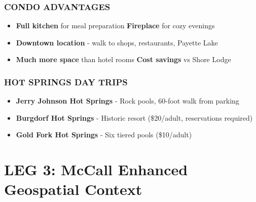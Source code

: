 \documentclass[
  11pt,
]{article}
\providecommand{\tightlist}{%
  \setlength{\itemsep}{0pt}\setlength{\parskip}{0pt}}
\begin{document}
\subsubsection{\texorpdfstring{\textcolor{primary}{CONDO ADVANTAGES}}{}}\label{section-21}

\begin{itemize}
\tightlist
\item
  \textbf{\textcolor{secondary}{Full kitchen}} for meal preparation
  \textbar{} \textbf{\textcolor{secondary}{Fireplace}} for cozy
  evenings\\
\item
  \textbf{\textcolor{secondary}{Downtown location}} - walk to shops,
  restaurants, Payette Lake\\
\item
  \textbf{\textcolor{secondary}{Much more space}} than hotel rooms
  \textbar{} \textbf{\textcolor{secondary}{Cost savings}} vs Shore Lodge
\end{itemize}

\subsubsection{\texorpdfstring{\textcolor{primary}{HOT SPRINGS DAY TRIPS}}{}}\label{section-22}

\begin{itemize}
\tightlist
\item
  \textbf{\textcolor{secondary}{Jerry Johnson Hot Springs}} - Rock
  pools, 60-foot walk from parking
\item
  \textbf{\textcolor{secondary}{Burgdorf Hot Springs}} - Historic resort
  (\$20/adult, reservations required)
\item
  \textbf{\textcolor{secondary}{Gold Fork Hot Springs}} - Six tiered
  pools (\$10/adult)
\end{itemize}

\newpage

\section{\texorpdfstring{\textcolor{primary}{LEG 3: McCall Enhanced Geospatial Context}}{}}\label{section-23}
\end{document}
